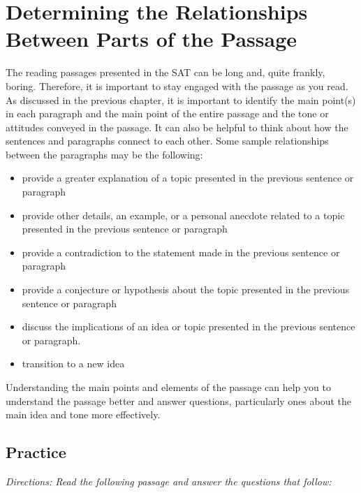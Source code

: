 \section{\sloppy Determining the Relationships Between Parts of the Passage}

The reading passages presented in the SAT can be long and, quite frankly, boring. Therefore, it is important to stay engaged with the passage as you read. As discussed in the previous chapter, it is important to identify the main point(s) in each paragraph and the main point of the entire passage and the tone or attitudes conveyed in the passage. It can also be helpful to think about how the sentences and paragraphs connect to each other. Some sample relationships between the paragraphs may be the following:

\bigskip
\begin{itemize}
\item provide a greater explanation of a topic presented in the previous sentence or paragraph 

\bigskip
\item provide other details, an example, or a personal anecdote related to a topic presented in the previous sentence or paragraph

\bigskip
\item provide a contradiction to the statement made in the previous sentence or paragraph

\bigskip
\item provide a conjecture or hypothesis about the topic presented in the previous sentence or paragraph

\bigskip
\item discuss the implications of an idea or topic presented in the previous sentence or paragraph. 

\bigskip
\item transition to a new idea

\end{itemize}

Understanding the main points and elements of the passage can help you to understand the passage better and answer questions, particularly ones about the main idea and tone more effectively. 

\subsection{Practice}

\bigskip
\textit{Directions: Read the following passage and answer the questions that follow:}

